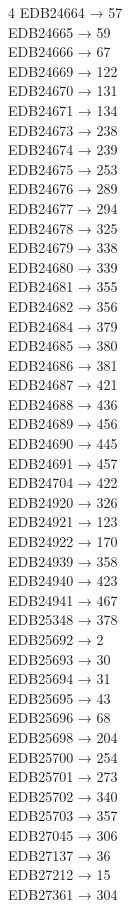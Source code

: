 \begin{multicols}{4}
EDB24664 → 57\\
EDB24665 → 59\\
EDB24666 → 67\\
EDB24669 → 122\\
EDB24670 → 131\\
EDB24671 → 134\\
EDB24673 → 238\\
EDB24674 → 239\\
EDB24675 → 253\\
EDB24676 → 289\\
EDB24677 → 294\\
EDB24678 → 325\\
EDB24679 → 338\\
EDB24680 → 339\\
EDB24681 → 355\\
EDB24682 → 356\\
EDB24684 → 379\\
EDB24685 → 380\\
EDB24686 → 381\\
EDB24687 → 421\\
EDB24688 → 436\\
EDB24689 → 456\\
EDB24690 → 445\\
EDB24691 → 457\\
EDB24704 → 422\\
EDB24920 → 326\\
EDB24921 → 123\\
EDB24922 → 170\\
EDB24939 → 358\\
EDB24940 → 423\\
EDB24941 → 467\\
EDB25348 → 378\\
EDB25692 → 2\\
EDB25693 → 30\\
EDB25694 → 31\\
EDB25695 → 43\\
EDB25696 → 68\\
EDB25698 → 204\\
EDB25700 → 254\\
EDB25701 → 273\\
EDB25702 → 340\\
EDB25703 → 357\\
EDB27045 → 306\\
EDB27137 → 36\\
EDB27212 → 15\\
EDB27361 → 304\\

\end{multicols}
